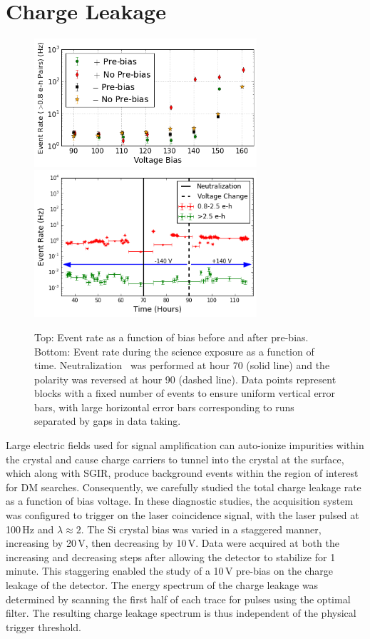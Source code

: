 \documentclass[%
reprint,
superscriptaddress,
preprintnumbers,
amsmath,amssymb,
prl,
aps,
floatfix
]{revtex4-1}
\newcommand{\eh}{$e^-h^+$}
\begin{document}
\section{Charge Leakage}

\begin{figure}[t]
\centering
\includegraphics[width=3.25in]{LeakageVBias.png}
\includegraphics[width=3.25in]{Leakage-PaperDraft-14ptAxes.png}
\caption{Top: Event rate as a function of bias before and after pre-bias. Bottom: Event rate during the science exposure as a function of time. Neutralization~\cite{Romani} was performed at hour 70 (solid line) and the polarity was reversed at hour 90 (dashed line). Data points represent blocks with a fixed number of events to ensure uniform vertical error bars, with large horizontal error bars corresponding to runs separated by gaps in data taking.}\label{fig:leakage}
\end{figure}


Large electric fields used for signal amplification can auto-ionize impurities within the crystal and cause charge carriers to tunnel into the crystal at the surface, which along with SGIR, produce background events within the region of interest for DM searches. Consequently, we carefully studied the total charge leakage rate as a function of bias voltage. In these diagnostic studies, the acquisition system was configured to trigger on the laser coincidence signal, with the laser pulsed at 100\,Hz and $\lambda\approx2$. The Si crystal bias was varied in a staggered manner, increasing by 20\,V, then decreasing by 10\,V. Data were acquired at both the increasing and decreasing steps after allowing the detector to stabilize for 1 minute. This staggering enabled the study of a 10\,V pre-bias on the charge leakage of the detector. The energy spectrum of the charge leakage was determined by scanning the first half of each trace for pulses using the optimal filter. The resulting charge leakage spectrum is thus independent of the physical trigger threshold.
\end{document}
